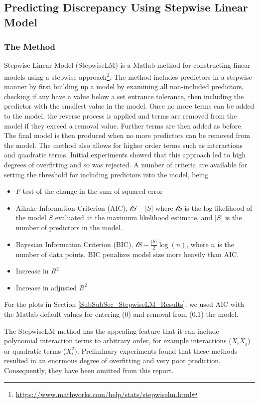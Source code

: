 \documentclass[11pt,a4paper,oneside]{article}
\begin{document}
\clearpage

\subsection{Predicting Discrepancy Using Stepwise Linear Model}\label{SubSec_StepwiseLM_Discrepancy}
\subsubsection{The Method}
Stepwise Linear Model (StepwiseLM) is a Matlab method for constructing linear models using a stepwise approach\footnote{\url{https://www.mathworks.com/help/stats/stepwiselm.html}}. The method includes predictors in a stepwise manner by first building  up a model by examining all non-included predictors, checking if any have a value below a set entrance tolerance, then including the predictor with the smallest value in the model. Once no more terms can be added to the model, the reverse process is applied and terms are removed from the model if they exceed a removal value. Further terms are then added as before. The final model is then produced when no more predictors can be removed from the model. The method also allows for higher order terms such as interactions and quadratic terms. Initial experiments showed that this approach led to high degrees of overfitting and so was rejected. A number of criteria are available for setting the threshold for including predictors into the model\cite{Wasserman2004}, being
\begin{itemize}
\item $F$-test of the change in the sum of squared error 
\item Aikake Information Criterion (AIC), $\mathcal{l}S-|S|$ where $\mathcal{l}S$ is the log-likelihood of the model $S$ evaluated at the maximum likelihood estimate, and $|S|$ is the number of predictors in the model.
\item Bayesian Information Criterion (BIC), $\mathcal{l}S-\frac{|S|}{2} \log( n )$, where $n$ is the number of data points. BIC penalizes model size more heavily than AIC.
\item Increase in $R^2$
\item Increase in adjusted $R^2$
\end{itemize}
For the plots in Section \ref{SubSubSec_StepwiseLM_Results}, we used AIC with the Matlab default values for entering ($0$) and removal from ($0.1$) the model. 

The StepwiseLM method has the appealing feature that it can include polynomial interaction terms to arbitrary order, for example interactions ($X_iX_j$) or quadratic terms ($X_i^2$). Preliminary experiments found that these methods resulted in an enormous degree of overfitting and very poor prediction. Consequently, they have been omitted from this report.
\end{document}
